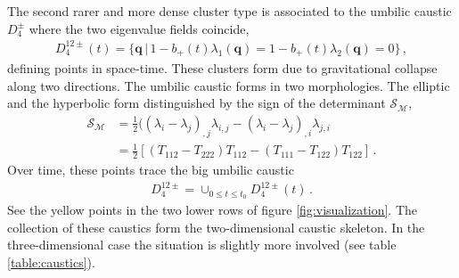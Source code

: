 \documentclass[a4paper, 11pt]{article}
\begin{document}
The second rarer and more dense cluster type is associated to the umbilic caustic $D_4^{\pm}$ where the two eigenvalue fields coincide,
\begin{align}
D_4^{12 \pm}(t) = \{\bm{q}\,|\,1 - b_+(t)\lambda_1(\bm{q}) = 1 - b_+(t) \lambda_2(\bm{q}) = 0\}\,,
\end{align}
defining points in space-time. These clusters form due to gravitational collapse along two directions. The umbilic caustic forms in two morphologies. The elliptic and the hyperbolic form distinguished by the sign of the determinant $ \mathcal{S}_{\mathcal{M}}$,
\begin{align}
\mathcal{S}_{\mathcal{M}} &= \frac{1}{2}((\lambda_i - \lambda_j)_{,j} \lambda_{i,j} - (\lambda_i - \lambda_j)_{,i} \lambda_{j,i}\nonumber\\
& = \frac{1}{2} [(T_{112}-T_{222})T_{112} - (T_{111}-T_{122})T_{122}]\,.
\end{align}
Over time, these points trace the big umbilic caustic
\begin{align}
D_4^{12 \pm} = \cup_{0 \leq t \leq t_0} D_4^{12 \pm}(t)\,.
\end{align}
See the yellow points in the two lower rows of figure \ref{fig:visualization}. The collection of these caustics form the two-dimensional caustic skeleton. In the three-dimensional case the situation is slightly more involved (see table \ref{table:caustics}).
\end{document}
